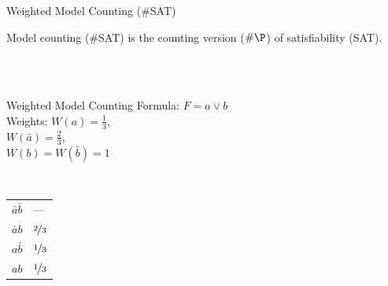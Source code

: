 \begin{frame}{Weighted Model Counting (\#SAT)}


Model counting (\#SAT) is the counting version ($\#\P$) of satisfiability (SAT).

\pause

~\\
~\\
%

%  
%
%

\begin{example}{Weighted Model Counting}
  Formula: $F = a \vee b$\\\vspace{.5em}
  Weights: $W(a) = \frac13,$\\
  \phantom{Weights: }$W(\bar a) = \frac23$, \\
  \phantom{Weights: }$W(b)=W(\bar b) = 1$
  
  \vspace{.5em}
  ~\\

\begin{center}
  \begin{tabular}{|l|l|}
  \hline
  	$\bar a \bar b $ & --- \\
  	$\bar a  b $ & $\nicefrac 23$ \\
  	$a \bar b $ & $\nicefrac 13$ \\
  	$a b$ & $\nicefrac 13$\\
  \hline
  \end{tabular} 
\end{center}


\end{example}
\end{frame}

